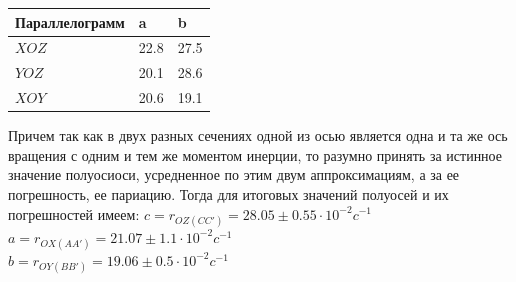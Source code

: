 \documentclass[a4paper,12pt]{article} %
\begin{document}
\begin{itemize}
\begin{table}[!ht]
    \centering
    \begin{tabular}{|l|l|l|} \hline
        Параллелограмм & a & b  \\ \hline
        $XOZ$ & 22.8 & 27.5  \\ \hline
        $YOZ$ & 20.1 & 28.6  \\ \hline
        $XOY$ & 20.6 & 19.1  \\ \hline
    \end{tabular}
\end{table}

Причем так как в двух разных сечениях одной из осью является одна и та же ось вращения с одним и тем же
 моментом инерции, то разумно принять за истинное значение полуосиоси, усредненное по этим двум аппроксимациям, а за ее погрешность, ее париацию.
Тогда для итоговых значений полуосей и их погрешностей имеем:
$c=r_{OZ(CC')}= 28.05 \pm 0.55 \cdot 10^{-2}c^{-1}$\\
$a=r_{OX(AA')}= 21.07 \pm 1.1 \cdot 10^{-2}c^{-1}$\\
$b=r_{OY(BB')}= 19.06 \pm 0.5 \cdot 10^{-2}c^{-1}$


\end{itemize}
\end{document}
